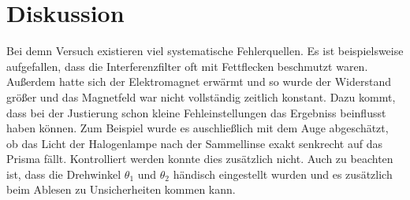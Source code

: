 \section{Diskussion}
\label{sec:diskussion}

Bei demn Versuch existieren viel systematische Fehlerquellen. Es ist beispielsweise aufgefallen, dass die Interferenzfilter oft 
mit Fettflecken beschmutzt waren. 
Außerdem hatte sich der Elektromagnet erwärmt und so wurde der Widerstand größer und das Magnetfeld war nicht vollständig zeitlich
konstant.
Dazu kommt, dass bei der Justierung schon kleine Fehleinstellungen das Ergebniss 
beinflusst haben können. Zum Beispiel wurde es auschließlich mit dem Auge abgeschätzt, ob das Licht der Halogenlampe nach der
Sammellinse exakt senkrecht auf das Prisma fällt.  Kontrolliert werden konnte dies zusätzlich nicht.
Auch zu beachten ist, dass die Drehwinkel $\theta_1$ und $\theta_2$ händisch eingestellt wurden und es zusätzlich
beim Ablesen zu Unsicherheiten kommen kann.